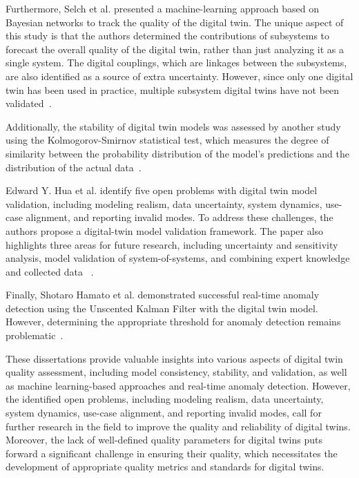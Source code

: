 \documentclass{llncs}
\begin{document}
    Furthermore, Selch et al. presented a machine-learning approach based on Bayesian networks to track the quality of the digital twin. 
    The unique aspect of this study is that the authors determined the contributions of subsystems to forecast the overall quality of the digital twin, 
    rather than just analyzing it as a single system. The digital couplings, which are linkages between the subsystems, are also identified as a source of extra uncertainty. 
    However, since only one digital twin has been used in practice, multiple subsystem digital twins have not been validated~\cite{QualityMonitoringofCoupledDigitalTwins}.

    Additionally, the stability of digital twin models was assessed by another study using the Kolmogorov-Smirnov statistical test, 
    which measures the degree of similarity between the probability distribution of the model's predictions and the distribution of the actual data~\cite{RadarDigitalTwin}.

    Edward Y. Hua et al. identify five open problems with digital twin model validation, including modeling realism, data uncertainty, system dynamics, use-case alignment, and reporting invalid modes.
    To address these challenges, the authors propose a digital-twin model validation framework. The paper also highlights three areas for future research, 
    including uncertainty and sensitivity analysis, model validation of system-of-systems, and combining expert knowledge and collected data ~\cite{ValidationofDigitalTwins}. 

    Finally, Shotaro Hamato et al. demonstrated successful real-time anomaly detection using the Unscented Kalman Filter with the digital twin model. 
    However, determining the appropriate threshold for anomaly detection remains problematic~\cite{JapeneseKalmanFilterCorrectness}.

    These dissertations provide valuable insights into various aspects of digital twin quality assessment, including model consistency, stability, and validation, as well as machine learning-based approaches and real-time anomaly detection. 
    However, the identified open problems, including modeling realism, data uncertainty, system dynamics, use-case alignment, and reporting invalid modes, call for further research in the field to improve the quality and reliability of digital twins. Moreover, 
    the lack of well-defined quality parameters for digital twins puts forward a significant challenge in ensuring their quality, which necessitates the development of appropriate quality metrics and standards for digital twins.
  
\end{document}
